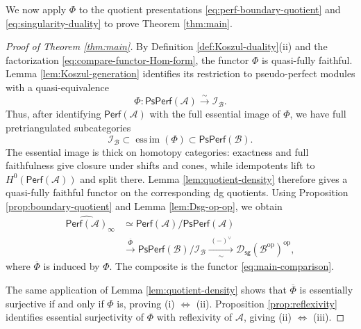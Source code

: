 \documentclass[11pt,letterpaper,reqno]{amsart}
\theoremstyle{plain}
\theoremstyle{definition}
\theoremstyle{plain}
\theoremstyle{definition}
\numberwithin{equation}{section}
\begin{document}
We now apply $\Phi$ to the quotient presentations \eqref{eq:perf-boundary-quotient} and \eqref{eq:singularity-duality} to prove Theorem \ref{thm:main}.

\begin{proof}[Proof of Theorem \ref{thm:main}]
By Definition \ref{def:Koszul-duality}(ii) and the factorization \eqref{eq:compare-functor-Hom-form}, the functor $\Phi$ is quasi-fully faithful.
Lemma \ref{lem:Koszul-generation} identifies its restriction to pseudo-perfect modules with a quasi-equivalence
\[
\Phi:\mathsf{PsPerf}(\mathscr A)\xrightarrow{\;\sim\;}\mathscr I_{\mathscr B}.
\]
Thus, after identifying $\mathsf{Perf}(\mathscr A)$ with the full essential image of $\Phi$, we have full pretriangulated subcategories
\[
\mathscr I_{\mathscr B}
\subset\operatorname{ess\,im}(\Phi)
\subset\mathsf{PsPerf}(\mathscr B).
\]
The essential image is thick on homotopy categories: exactness and full faithfulness give closure under shifts and cones, while idempotents lift to $H^0(\mathsf{Perf}(\mathscr A))$ and split there.
Lemma \ref{lem:quotient-density} therefore gives a quasi-fully faithful functor on the corresponding dg quotients.
Using Proposition \ref{prop:boundary-quotient} and Lemma \ref{lem:Dsg-op-op}, we obtain
\begin{equation}\label{eq:comparison-quotients}
\begin{aligned}
\widehat{\mathsf{Perf}(\mathscr A)}_{\infty}
&\simeq\mathsf{Perf}(\mathscr A)/\mathsf{PsPerf}(\mathscr A)\\
&\xrightarrow{\;\overline\Phi\;}
\mathsf{PsPerf}(\mathscr B)/\mathscr I_{\mathscr B}
\xrightarrow[\sim]{\;(-)^\vee\;}
\mathscr D_{\mathsf{sg}}(\mathscr B^{\mathrm{op}})^{\mathrm{op}},
\end{aligned}
\end{equation}
where $\overline\Phi$ is induced by $\Phi$.
The composite is the functor \eqref{eq:main-comparison}.

The same application of Lemma \ref{lem:quotient-density} shows that $\overline\Phi$ is essentially surjective if and only if $\Phi$ is, proving \textup{(i)} $\Longleftrightarrow$ \textup{(ii)}.
Proposition \ref{prop:reflexivity} identifies essential surjectivity of $\Phi$ with reflexivity of $\mathscr A$, giving \textup{(ii)} $\Longleftrightarrow$ \textup{(iii)}.


\end{proof}
\end{document}
